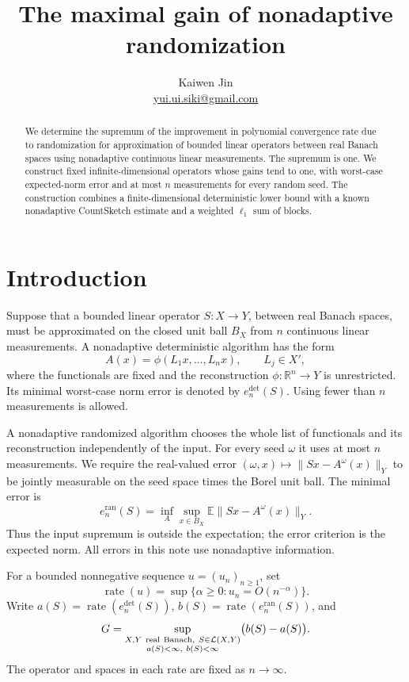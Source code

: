 \documentclass[11pt]{article}
\title{The maximal gain of nonadaptive randomization}
\author{Kaiwen Jin\\{\small\href{mailto:yui.ui.siki@gmail.com}{yui.ui.siki@gmail.com}}}
\date{}
\newcommand{\R}{\mathbb R}
\newcommand{\E}{\mathbb E}
\newcommand{\rate}{\operatorname{rate}}
\newcommand{\ed}{e^{\mathrm{det}}}
\newcommand{\er}{e^{\mathrm{ran}}}
\begin{document}
\maketitle

\begin{abstract}
We determine the supremum of the improvement in polynomial convergence rate
due to randomization for approximation of bounded linear operators between
real Banach spaces using nonadaptive continuous linear measurements.
The supremum is one. We construct fixed infinite-dimensional operators whose
gains tend to one, with worst-case expected-norm error and at most \(n\)
measurements for every random seed. The construction combines a
finite-dimensional deterministic lower bound with a known nonadaptive
CountSketch estimate and a weighted \(\ell_1\) sum of blocks.
\end{abstract}

\section{Introduction}

Suppose that a bounded linear operator \(S:X\to Y\), between real Banach
spaces, must be approximated on the closed unit ball \(B_X\) from \(n\)
continuous linear measurements. A nonadaptive deterministic algorithm has
the form
\[
 A(x)=\phi(L_1x,\ldots,L_nx),\qquad L_j\in X',
\]
where the functionals are fixed and the reconstruction \(\phi:\R^n\to Y\)
is unrestricted. Its minimal worst-case norm error is denoted by
\(\ed_n(S)\). Using fewer than \(n\) measurements is allowed.

A nonadaptive randomized algorithm chooses the whole list of functionals
and its reconstruction independently of the input. For every seed \(\omega\)
it uses at most \(n\) measurements. We require the real-valued error
\((\omega,x)\mapsto\|Sx-A^\omega(x)\|_Y\) to be jointly measurable on the
seed space times the Borel unit ball. The minimal error is
\[
 \er_n(S)=\inf_A\sup_{x\in B_X}\E\|Sx-A^\omega(x)\|_Y.
\]
Thus the input supremum is outside the expectation; the error criterion is
the expected norm. All errors in this note use nonadaptive information.

For a bounded nonnegative sequence \(u=(u_n)_{n\ge1}\), set
\[
 \rate(u)=\sup\{\alpha\ge0:u_n=O(n^{-\alpha})\}.
\]
Write \(a(S)=\rate(\ed_n(S))\), \(b(S)=\rate(\er_n(S))\), and
\begin{equation}\label{eq:G}
 G=\sup_{\substack{X,Y\ {\rm real\ Banach},\ S\in\mathcal L(X,Y)\\
                   a(S)<\infty,\ b(S)<\infty}}
       \bigl(b(S)-a(S)\bigr).
\end{equation}
The operator and spaces in each rate are fixed as \(n\to\infty\).
\end{document}
